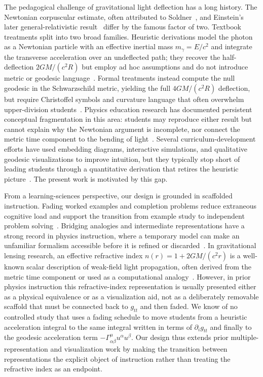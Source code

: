 \documentclass{article}
\begin{document}
The pedagogical challenge of gravitational light deflection has a long history. The Newtonian corpuscular estimate, often attributed to Soldner~\cite{Soldner1804}, and Einstein's later general-relativistic result~\cite{Einstein1911,Einstein1916} differ by the famous factor of two. Textbook treatments split into two broad families. Heuristic derivations model the photon as a Newtonian particle with an effective inertial mass $m_\gamma = E/c^2$ and integrate the transverse acceleration over an undeflected path; they recover the half-deflection $2GM/(c^2 R)$ but employ ad hoc assumptions and do not introduce metric or geodesic language~\cite{Hartle2003,Moore2013,Schutz2009}. Formal treatments instead compute the null geodesic in the Schwarzschild metric, yielding the full $4GM/(c^2 R)$ deflection, but require Christoffel symbols and curvature language that often overwhelm upper-division students~\cite{Hartle2003,Moore2013}. Physics education research has documented persistent conceptual fragmentation in this area: students may reproduce either result but cannot explain why the Newtonian argument is incomplete, nor connect the metric time component to the bending of light~\cite{Baily2017,Dray2012,Steinberg2000}. Several curriculum-development efforts have used embedding diagrams, interactive simulations, and qualitative geodesic visualizations to improve intuition, but they typically stop short of leading students through a quantitative derivation that retires the heuristic picture~\cite{Weiskopf2006,Kohnle2013,Zahn2020}. The present work is motivated by this gap.

From a learning-sciences perspective, our design is grounded in scaffolded instruction. Fading worked examples and completion problems reduce extraneous cognitive load and support the transition from example study to independent problem solving~\cite{Renkl2014,Sweller2011,VanLehn2005}. Bridging analogies and intermediate representations have a strong record in physics instruction, where a temporary model can make an unfamiliar formalism accessible before it is refined or discarded~\cite{Clement1993,Ainsworth2006}. In gravitational lensing research, an effective refractive index $n(r)=1+2GM/(c^2 r)$ is a well-known scalar description of weak-field light propagation, often derived from the metric time component or used as a computational analogy~\cite{DeFelice1990,Bozza2008,Meneghetti2021}. However, in prior physics instruction this refractive-index representation is usually presented either as a physical equivalence or as a visualization aid, not as a deliberately removable scaffold that must be connected back to $g_{tt}$ and then faded. We know of no controlled study that uses a fading schedule to move students from a heuristic acceleration integral to the same integral written in terms of $\partial_i g_{tt}$ and finally to the geodesic acceleration term $-\Gamma^\mu_{\alpha\beta}u^\alpha u^\beta$. Our design thus extends prior multiple-representation and visualization work by making the transition between representations the explicit object of instruction rather than treating the refractive index as an endpoint.
\end{document}
